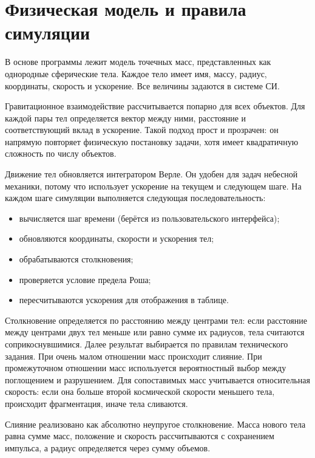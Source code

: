 \documentclass[14pt,a4paper]{extarticle}
\begin{document}
	\section{Физическая модель и правила симуляции}
	
	В основе программы лежит модель точечных масс, представленных как однородные сферические тела. Каждое тело имеет имя, массу, радиус, координаты, скорость и ускорение. Все величины задаются в системе СИ.%
	
	Гравитационное взаимодействие рассчитывается попарно для всех объектов. Для каждой пары тел определяется вектор между ними, расстояние и соответствующий вклад в ускорение. Такой подход прост и прозрачен: он напрямую повторяет физическую постановку задачи, хотя имеет квадратичную сложность по числу объектов.
	
	Движение тел обновляется интегратором Верле. Он удобен для задач небесной механики, потому что использует ускорение на текущем и следующем шаге. На каждом шаге симуляции выполняется следующая последовательность:
	\begin{itemize}
		\item вычисляется шаг времени (берётся из пользовательского интерфейса);
		\item обновляются координаты, скорости и ускорения тел;
		\item обрабатываются столкновения;
		\item проверяется условие предела Роша;
		\item пересчитываются ускорения для отображения в таблице.
	\end{itemize}
	
	Столкновение определяется по расстоянию между центрами тел: если расстояние между центрами двух тел меньше или равно сумме их радиусов, тела считаются соприкоснувшимися. Далее результат выбирается по правилам технического задания. При очень малом отношении масс происходит слияние. При промежуточном отношении масс используется вероятностный выбор между поглощением и разрушением. Для сопоставимых масс учитывается относительная скорость: если она больше второй космической скорости меньшего тела, происходит фрагментация, иначе тела сливаются.
	
	Слияние реализовано как абсолютно неупругое столкновение. Масса нового тела равна сумме масс, положение и скорость рассчитываются с сохранением импульса, а радиус определяется через сумму объемов. %
	
\end{document}
